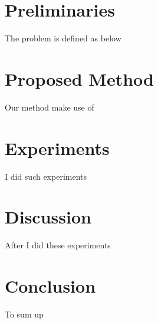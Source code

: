 \documentclass[letterpaper]{article}
\begin{document}
\section{Preliminaries}
The problem is defined as below

\section{Proposed Method}
Our method make use of

\section{Experiments}
I did such experiments

\section{Discussion}
After I did these experiments

\section{Conclusion}
To sum up



\end{document}
